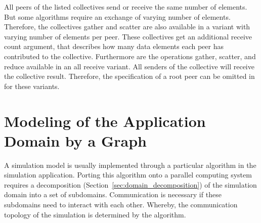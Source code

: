 \noindent All peers of the listed collectives send or receive the same
number of elements.  But some algorithms require an exchange of
varying number of elements. Therefore, the collectives gather and
scatter are also available in a variant with varying number of
elements per peer. These collectives get an additional receive count
argument, that describes how many data elements each peer has
contributed to the collective. Furthermore are the operations gather,
scatter, and reduce available in an all receive variant. All senders
of the collective will receive the collective result. Therefore, the
specification of a root peer can be omitted in for these variants.


\section{Modeling of the Application Domain by a Graph}
\label{sec:graph}
A simulation model is usually implemented through a particular
algorithm in the simulation application.  Porting this algorithm onto
a parallel computing system requires a decomposition
(Section~\ref{sec:domain_decomposition}) of the simulation domain into
a set of subdomains.  Communication is necessary if these subdomains
need to interact with each other.  Whereby, the communication topology
of the simulation is determined by the algorithm.



